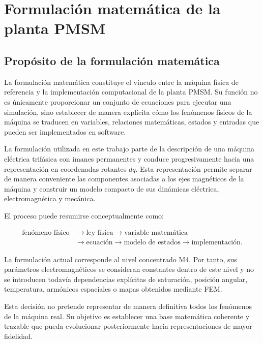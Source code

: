 \section{Formulación matemática de la planta PMSM}

\subsection{Propósito de la formulación matemática}

La formulación matemática constituye el vínculo entre la máquina física de referencia y la implementación computacional de la planta PMSM. Su función no es únicamente proporcionar un conjunto de ecuaciones para ejecutar una simulación, sino establecer de manera explícita cómo los fenómenos físicos de la máquina se traducen en variables, relaciones matemáticas, estados y entradas que pueden ser implementados en software.

La formulación utilizada en este trabajo parte de la descripción de una máquina eléctrica trifásica con imanes permanentes y conduce progresivamente hacia una representación en coordenadas rotantes $dq$. Esta representación permite separar de manera conveniente las componentes asociadas a los ejes magnéticos de la máquina y construir un modelo compacto de sus dinámicas eléctrica, electromagnética y mecánica.

El proceso puede resumirse conceptualmente como:

\begin{equation}
\begin{aligned}
\text{fenómeno físico}
&\rightarrow \text{ley física}
\rightarrow \text{variable matemática}
\\
&\rightarrow \text{ecuación}
\rightarrow \text{modelo de estados}
\rightarrow \text{implementación}.
\end{aligned}
\end{equation}

La formulación actual corresponde al nivel concentrado M4. Por tanto, sus parámetros electromagnéticos se consideran constantes dentro de este nivel y no se introducen todavía dependencias explícitas de saturación, posición angular, temperatura, armónicos espaciales o mapas obtenidos mediante FEM.

Esta decisión no pretende representar de manera definitiva todos los fenómenos de la máquina real. Su objetivo es establecer una base matemática coherente y trazable que pueda evolucionar posteriormente hacia representaciones de mayor fidelidad.

